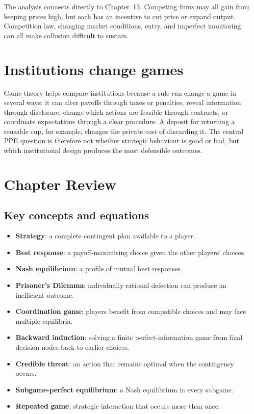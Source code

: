The analysis connects directly to Chapter~13. Competing firms may all gain
from keeping prices high, but each has an incentive to cut price or expand
output. Competition law, changing market conditions, entry, and imperfect
monitoring can all make collusion difficult to sustain.

\section{Institutions change games}

Game theory helps compare institutions because a rule can change a game in
several ways: it can alter payoffs through taxes or penalties, reveal
information through disclosure, change which actions are feasible through
contracts, or coordinate expectations through a clear procedure. A deposit
for returning a reusable cup, for example, changes the private cost of
discarding it. The central PPE question is therefore not whether strategic
behaviour is good or bad, but which institutional design produces the most
defensible outcomes.

\section*{Chapter Review}

\subsection*{Key concepts and equations}
\begin{itemize}
  \item \textbf{Strategy}: a complete contingent plan available to a player.
  \item \textbf{Best response}: a payoff-maximising choice given the other players' choices.
  \item \textbf{Nash equilibrium}: a profile of mutual best responses.
  \item \textbf{Prisoner's Dilemma}: individually rational defection can produce an inefficient outcome.
  \item \textbf{Coordination game}: players benefit from compatible choices and may face multiple equilibria.
  \item \textbf{Backward induction}: solving a finite perfect-information
  game from final decision nodes back to earlier choices.
  \item \textbf{Credible threat}: an action that remains optimal when the contingency occurs.
  \item \textbf{Subgame-perfect equilibrium}: a Nash equilibrium in every subgame.
  \item \textbf{Repeated game}: strategic interaction that occurs more than once.
\end{itemize}

